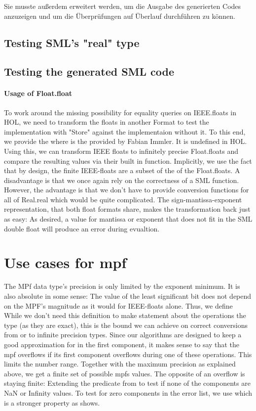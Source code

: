 \documentclass[11pt,a4paper]{article}
\begin{document}
Sie musste außerdem erweitert werden, um die Ausgabe des generierten Codes anzuzeigen und um die Überprüfungen auf Überlauf durchführen zu können.

\subsection{Testing SML's "real" type}

\subsection {Testing the generated SML code}
\paragraph {Usage of Float.float}

To work around the missing possibility for equality queries on IEEE.floats in HOL, we need to transform the floats in another Format to test the implementation with "Store" against the implementaion without it. To this end, we provide the
where
is the
provided by Fabian Immler. It is undefined in HOL. Using this, we can transform IEEE floats to infinitely precise Float.floats and compare the resulting values via their built in
function. Implicitly, we use the fact that by design, the finite IEEE-floats are a subset of the of the Float.floats. A disadvantage is that we once again rely on the correctness of a SML function. However, the advantage is that we don't have to provide conversion functions for all of Real.real which would be quite complicated. The sign-mantissa-exponent representation, that both float formats share, makes the transformation back just as easy:
As desired, a value for mantissa or exponent that does not fit in the SML double float will produce an error during evualtion.

\section{Use cases for mpf}
The MPf data type's precision is only limited by the exponent minimum. It is also absolute in some sense: The value of the least significant bit
does not depend on the MPF's magnitude as it would for IEEE-floats alone.
Thus, we define
While we don't need this definition to make statement about the operations
the \typmpf type (as they are exact), this is the bound we can achieve on correct conversions from or to infinite precision types.
Since our algorithms are designed to keep a good approximation for
in the first component, it makes sense to say that the mpf overflows if its first component overflows during one of these operations. This limits the number range. Together with the maximum precision as explained above, we get a finite set of possible mpfs values.
The opposite of an overflow is staying finite: Extending the
predicate from
to test if none of the components are NaN or Infinity values. To test for zero components in the error list, we use
which is a stronger property as
shows.
\end{document}
